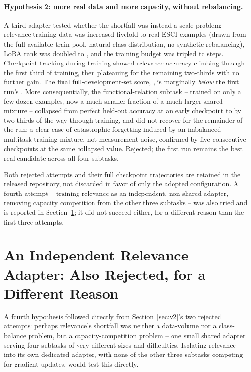 \documentclass{article}
\begin{document}
\paragraph{Hypothesis 2: more real data and more capacity, without rebalancing.} A third adapter tested whether the shortfall was instead a scale problem: relevance training data was increased fivefold to \AdapterThreeRelevanceRows{} real ESCI examples (drawn from the full available train pool, natural class distribution, no synthetic rebalancing), LoRA rank was doubled to \AdapterThreeLoraRank{}, and the training budget was tripled to \AdapterThreeTrainSteps{} steps. Checkpoint tracking during training showed relevance accuracy climbing through the first third of training, then plateauing for the remaining two-thirds with no further gain. The final full-development-set score, \AdapterThreeRelevanceAcc{}, is marginally \emph{below} the first run's \AdapterOneRelevanceAcc{}. More consequentially, the functional-relation subtask -- trained on only a few dozen examples, now a much smaller fraction of a much larger shared mixture -- collapsed from perfect held-out accuracy at an early checkpoint to \AdapterThreeFunctionalAcc{} by two-thirds of the way through training, and did not recover for the remainder of the run: a clear case of catastrophic forgetting induced by an imbalanced multitask training mixture, not measurement noise, confirmed by five consecutive checkpoints at the same collapsed value. Rejected; the first run remains the best real candidate across all four subtasks.

Both rejected attempts and their full checkpoint trajectories are retained in the released repository, not discarded in favor of only the adopted configuration. A fourth attempt -- training relevance as an independent, non-shared adapter, removing capacity competition from the other three subtasks -- was also tried and is reported in Section~\ref{sec:relevance-isolated}; it did not succeed either, for a different reason than the first three attempts.

\section{An Independent Relevance Adapter: Also Rejected, for a Different Reason}
\label{sec:relevance-isolated}
A fourth hypothesis followed directly from Section~\ref{sec:v2}'s two rejected attempts: perhaps relevance's shortfall was neither a data-volume nor a class-balance problem, but a capacity-competition problem -- one small shared adapter serving four subtasks of very different sizes and difficulties. Isolating relevance into its own dedicated adapter, with none of the other three subtasks competing for gradient updates, would test this directly.
\end{document}
